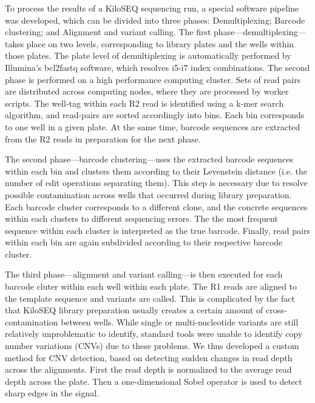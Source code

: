 To process the results of a KiloSEQ sequencing run, a special software pipeline was developed, which can be divided into three phases: Demultiplexing; Barcode clustering; and Alignment and variant calling.
The first phase---demultiplexing---takes place on two levels, corresponding to library plates and the wells within those plates. The plate level of demultiplexing is automatically performed by Illumina's bcl2fastq software, which resolves i5-i7 index combinations. The second phase is performed on a high performance computing cluster. Sets of read pairs are distributed across computing nodes, where they are processed by worker scripts. The well-tag within each R2 read is identified using a k-mer search algorithm, and read-pairs are sorted accordingly into bins. Each bin corresponds to one well in a given plate. At the same time, barcode sequences are extracted from the R2 reads in preparation for the next phase. 

The second phase---barcode clustering---uses the extracted barcode sequences within each bin and clusters them according to their Levenstein distance (i.e. the number of edit operations separating them). This step is necessary due to resolve possible contamination across wells that occurred during library preparation. Each barcode cluster corresponds to a different clone, and the concrete sequences within each clusters to different sequencing errors. The the most frequent sequence within each cluster is interpreted as the true barcode. Finally, read pairs within each bin are again subdivided according to their respective barcode cluster.

The third phase---alignment and variant calling---is then executed for each barcode cluter within each well within each plate. The R1 reads are aligned to the template sequence and variants are called. This is complicated by the fact that KiloSEQ library preparation usually creates a certain amount of cross-contamination between wells. While single or multi-nucleotide variants are still relatively unproblematic to identify, standard tools were unable to identify copy number variations (CNVs) due to these problems. We thus developed a custom method for CNV detection, based on detecting sudden changes in read depth across the alignments. First the read depth is normalized to the average read depth across the plate. Then a one-dimensional Sobel operator is used to detect sharp edges in the signal.


